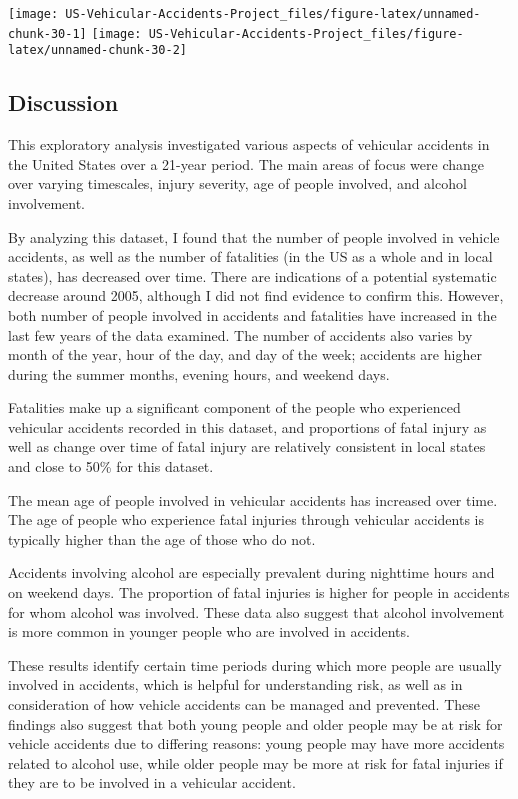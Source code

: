 \documentclass[]{article}
\begin{document}
\texttt{[image: US-Vehicular-Accidents-Project\_files/figure-latex/unnamed-chunk-30-1]}
\texttt{[image: US-Vehicular-Accidents-Project\_files/figure-latex/unnamed-chunk-30-2]}

\hypertarget{discussion}{%
\subsection{Discussion}\label{discussion}}

This exploratory analysis investigated various aspects of vehicular
accidents in the United States over a 21-year period. The main areas of
focus were change over varying timescales, injury severity, age of
people involved, and alcohol involvement.

By analyzing this dataset, I found that the number of people involved in
vehicle accidents, as well as the number of fatalities (in the US as a
whole and in local states), has decreased over time. There are
indications of a potential systematic decrease around 2005, although I
did not find evidence to confirm this. However, both number of people
involved in accidents and fatalities have increased in the last few
years of the data examined. The number of accidents also varies by month
of the year, hour of the day, and day of the week; accidents are higher
during the summer months, evening hours, and weekend days.

Fatalities make up a significant component of the people who experienced
vehicular accidents recorded in this dataset, and proportions of fatal
injury as well as change over time of fatal injury are relatively
consistent in local states and close to 50\% for this dataset.

The mean age of people involved in vehicular accidents has increased
over time. The age of people who experience fatal injuries through
vehicular accidents is typically higher than the age of those who do
not.

Accidents involving alcohol are especially prevalent during nighttime
hours and on weekend days. The proportion of fatal injuries is higher
for people in accidents for whom alcohol was involved. These data also
suggest that alcohol involvement is more common in younger people who
are involved in accidents.

These results identify certain time periods during which more people are
usually involved in accidents, which is helpful for understanding risk,
as well as in consideration of how vehicle accidents can be managed and
prevented. These findings also suggest that both young people and older
people may be at risk for vehicle accidents due to differing reasons:
young people may have more accidents related to alcohol use, while older
people may be more at risk for fatal injuries if they are to be involved
in a vehicular accident.
\end{document}
